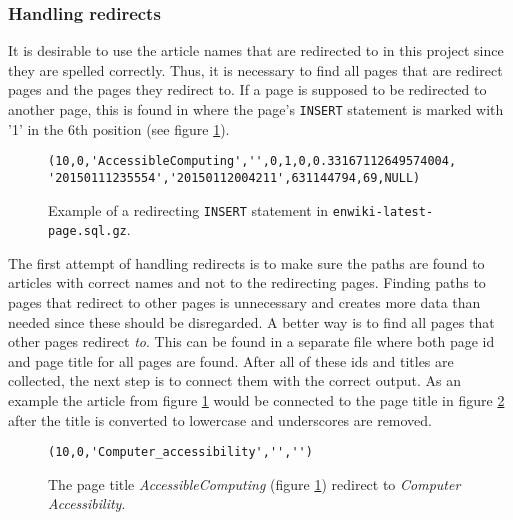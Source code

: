 \subsubsection{Handling redirects}
It is desirable to use the article names that are redirected to in this project since they are spelled correctly. Thus, it is necessary to find all pages that are redirect pages and the pages they redirect to. 
If a page is supposed to be redirected to another page, this is found in \enwikipage where the page's \texttt{INSERT} statement is marked with '1' in the 6th position (see figure \ref{fig:isredirect}).

\begin{figure}[h]
\centering
\begin{lstlisting}
(10,0,'AccessibleComputing','',0,1,0,0.33167112649574004,
'20150111235554','20150112004211',631144794,69,NULL)
\end{lstlisting}
\caption[\texttt{INSERT} statement with redirecting]{Example of a redirecting \texttt{INSERT} statement in \texttt{enwiki-latest-page.sql.gz}.} 
\label{fig:isredirect}
\end{figure}
The first attempt of handling redirects is to make sure the paths are found to articles with correct names and not to the redirecting pages. Finding paths to pages that redirect to other pages is unnecessary and creates more data than needed since these should be disregarded. A better way is to find all pages that other pages redirect \emph{to}. This can be found in a separate file \enwikiredirect where both page id and page title for all pages are found. After all of these ids and titles are collected, the next step is to connect them with the correct output. As an example the article from figure \ref{fig:isredirect} would  be connected to the page title in figure \ref{fig:correctacccomp} after the title is converted to lowercase and underscores are removed. 

\begin{figure}[h]
\centering
\begin{lstlisting}
(10,0,'Computer_accessibility','','')
\end{lstlisting}
\caption[Example of a page redirecting to]{The page title \emph{AccessibleComputing} (figure \ref{fig:isredirect}) redirect to \emph{Computer Accessibility}.}
\label{fig:correctacccomp}
\end{figure}



%

